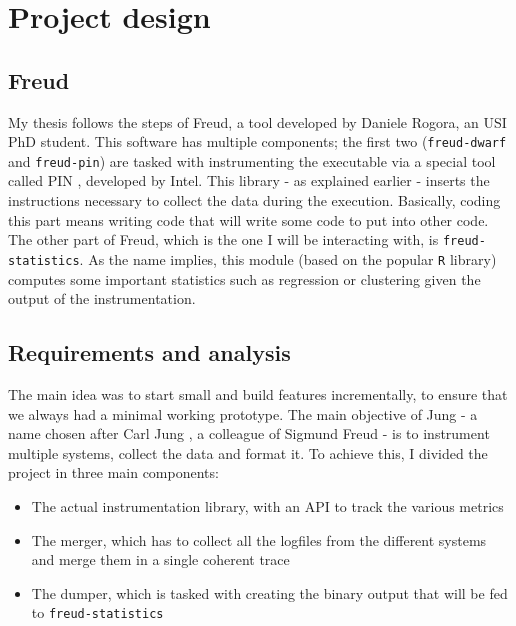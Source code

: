 \chapter{Project design}

    \section{Freud}\label{sec:freud}


        My thesis follows the steps of Freud, a tool developed by Daniele Rogora, an USI PhD student.
        This software has multiple components; the first two (\texttt{freud-dwarf} and \texttt{freud-pin})
        are tasked with instrumenting the executable 
        via a special tool called PIN \cite{pin}, developed by Intel. This library - as explained earlier - 
        inserts the instructions necessary to collect the data during the execution. Basically, coding this
        part means writing code that will write some code to put into other code.\\

        The other part of Freud, which is the one I will be interacting with, is \texttt{freud-statistics}.
        As the name implies, this module (based on the popular \texttt{R} library) computes some important
        statistics such as regression or clustering given the output of the instrumentation.


    \section{Requirements and analysis}


        The main idea was to start small and build features incrementally, to ensure that we always
        had a minimal working prototype. The main objective of Jung - a name chosen after Carl Jung \cite{jung},
        a colleague of Sigmund Freud - is to instrument multiple systems, collect the data and format it.
        To achieve this, I divided the project in three main components:

        \begin{itemize}
            \item The actual instrumentation library, with an API to track the various metrics
            \item The merger, which has to collect all the logfiles from the different systems
             and merge them in a single coherent trace
            \item The dumper, which is tasked with creating the binary output that will be fed
             to \texttt{freud-statistics}
        \end{itemize}

